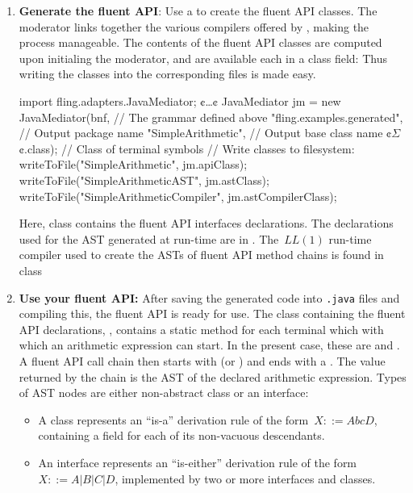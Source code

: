 \documentclass[a4paper,UKenglish,cleveref, autoref]{darts-v2019}
\begin{document}
\begin{content}
\begin{enumerate}
	\item \textbf{Generate the fluent API}: Use a  to
	create the fluent API classes. The moderator links together the various
	compilers offered by \Fling, making the process manageable. The contents
	of the fluent API classes are computed upon initialing the moderator, and
	are available each in a class field: Thus writing the classes into the
	corresponding files is made easy.
\begin{excerpt*}[language=java]
import fling.adapters.JavaMediator;
¢\ldots¢
JavaMediator jm = new JavaMediator(bnf, // The grammar defined above
  "fling.examples.generated", // Output package name
  "SimpleArithmetic", // Output base class name
  ¢$Σ$¢.class); // Class of terminal symbols
// Write classes to filesystem:
writeToFile("SimpleArithmetic", jm.apiClass);
writeToFile("SimpleArithmeticAST", jm.astClass);
writeToFile("SimpleArithmeticCompiler", jm.astCompilerClass);
\end{excerpt*}
Here, class  contains the fluent API interfaces
declarations.  The declarations used for the AST generated at run-time are in
.  
The~$LL(1)$ run-time compiler used to create the ASTs of fluent API method
chains is found in class 

  \item \textbf{Use your fluent API:} After saving the generated code into
    \texttt{.java} files and compiling this, the fluent API is ready for use.
	The class containing the fluent API declarations,
	, contains a static method for each terminal which
  with which an arithmetic expression can start. In the present case, 
    these are  and .
  A fluent API call chain then starts with  
  (or ) and ends with a . 
  The value returned by the chain is the AST of the declared arithmetic expression.
	Types of AST nodes are either non-abstract class or an interface:
	\begin{itemize}
		\item A class represents an ``is-a'' derivation rule of the form~$X ::= A b c D$,
			containing a field for each of its non-vacuous descendants.
		\item An interface represents an ``is-either'' derivation rule of the form~$X ::= A | B | C | D$,
			implemented by two or more interfaces and classes.
	\end{itemize}
\end{enumerate}


\end{content}
\end{document}

